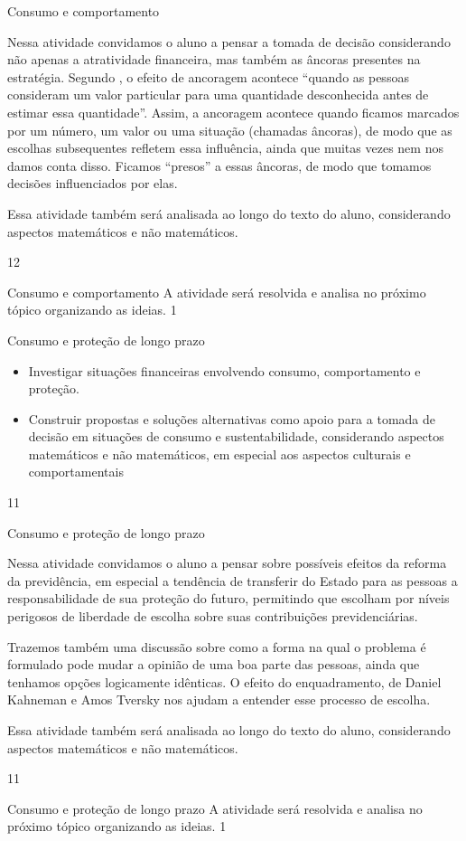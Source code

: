 \begin{sugestions}{Consumo e comportamento}
{
Nessa atividade convidamos o aluno a pensar a tomada de decisão considerando não apenas a atratividade financeira, mas também as âncoras presentes na estratégia. Segundo \cite{kahneman2012}, o efeito de ancoragem acontece “quando as pessoas consideram um valor particular para uma quantidade desconhecida antes de estimar essa quantidade”. \citep[p. 152]{kahneman2012} Assim, a ancoragem acontece quando ficamos marcados por um número, um valor ou uma situação (chamadas âncoras), de modo que as escolhas subsequentes refletem essa influência, ainda que muitas vezes nem nos damos conta disso. Ficamos “presos” a essas âncoras, de modo que tomamos decisões influenciados por elas.

Essa atividade também será analisada ao longo do texto do aluno, considerando aspectos matemáticos e não matemáticos. 

}{1}{2}
\end{sugestions}
\begin{answer}{Consumo e comportamento}
{
A atividade será resolvida e analisa no próximo tópico organizando as ideias.
}{1}
\end{answer}
\clearmargin
\begin{objectives}{Consumo e proteção de longo prazo}
{
\begin{itemize}
\item Investigar situações financeiras envolvendo consumo, comportamento e proteção.
\item Construir propostas e soluções alternativas como apoio para a tomada de decisão em situações de consumo e sustentabilidade, considerando aspectos matemáticos e não matemáticos, em especial aos aspectos culturais e comportamentais
\end{itemize}
}{1}{1}
\end{objectives}
\begin{sugestions}{Consumo e proteção de longo prazo}
{
Nessa atividade convidamos o aluno a pensar sobre possíveis efeitos da reforma da previdência, em especial a tendência de transferir do Estado para as pessoas a responsabilidade de sua proteção do futuro, permitindo que escolham por níveis perigosos de liberdade de escolha sobre suas contribuições previdenciárias.

Trazemos também uma discussão sobre como a forma na qual o problema é formulado pode mudar a opinião de uma boa parte das pessoas, ainda que tenhamos opções logicamente idênticas. O efeito do enquadramento, de Daniel Kahneman e Amos Tversky nos ajudam a entender esse processo de escolha.

Essa atividade também será analisada ao longo do texto do aluno, considerando aspectos matemáticos e não matemáticos. 
}{1}{1}
\end{sugestions}
\begin{answer}{Consumo e proteção de longo prazo}
{
A atividade será resolvida e analisa no próximo tópico organizando as ideias.
}{1}
\end{answer}

